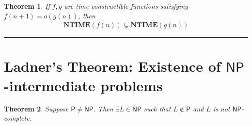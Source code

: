 \documentclass[twoside]{article}
\newcounter{lecnum}
\newtheorem{theorem}{Theorem}[lecnum]
\newenvironment{proof}{{\bf Proof:}}{\hfill\rule{2mm}{2mm}}
\begin{document}
\begin{theorem}
If $f, g$ are time-constructible functions satisfying $f(n+1) = o(g(n))$, then 
\begin{align}
\mathbf{NTIME}(f(n)) \subsetneq \mathbf{NTIME}(g(n)) \label{DistinguishNTime}
\end{align}
\end{theorem}
\begin{proof}

\end{proof}

\section{Ladner's Theorem: Existence of $\mathsf{NP}$-intermediate problems}

\begin{theorem}
Suppose $\mathsf{P} \neq \mathsf{NP}$. Then $\exists L \in \mathsf{NP}$ such that $L \notin \mathsf{P}$ and $L$ is not $\mathsf{NP}$-complete. 
\end{theorem}
\end{document}
